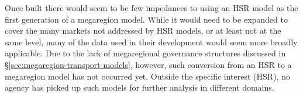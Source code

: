 Once built there would seem to be few impedances to using an HSR model as the first generation of a megaregion model. While it would need to be expanded to cover the many markets not addressed by HSR models, or at least not at the same level, many of the data used in their development would seem more broadly applicable. Due to the lack of megaregional governance structures discussed in \S\ref{sec:megaregion-transport-models}, however, such conversion from an HSR to a megaregion model has not occurred yet. Outside the specific interest (HSR), no agency has picked up such models for further analysis in different domains.

